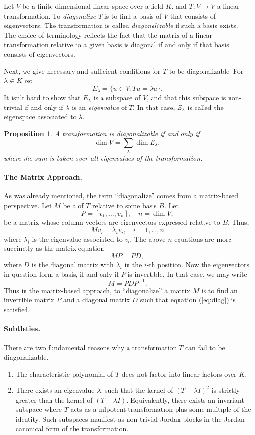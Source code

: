 \documentclass[12pt]{article}
\newtheorem{proposition}{Proposition}
\begin{document}
Let $V$ be a finite-dimensional linear space over a field $K$, and
$T:V\rightarrow V$ a linear transformation. To {\em diagonalize} $T$
is to find a basis of $V$ that consists of eigenvectors. The
transformation is called {\em diagonalizable} if such a basis exists.
The choice of terminology reflects the fact that
the matrix of a linear transformation relative to a given basis is  diagonal
if and only if that basis consists of
eigenvectors.

Next, we give necessary and sufficient conditions for $T$ to be
diagonalizable. For $\lambda\in K$ set
$$E_\lambda = \{ u\in V: Tu = \lambda u\}.$$
It isn't hard to show that $E_\lambda$ is a subspace of $V$, and that this subspace is
non-trivial if and only if $\lambda$ is an {\em eigenvalue} of $T$.  In that case, $E_\lambda$ is called the eigenspace
associated to $\lambda$. 
\begin{proposition}
A transformation is diagonalizable if and only if
$$\dim V = \sum_\lambda \dim E_\lambda,$$
where the sum is taken over all eigenvalues of the transformation.
\end{proposition}

\paragraph{The Matrix Approach.}
As was already mentioned, the  term  ``diagonalize'' comes from a matrix-based perspective.  Let
$M$ be a  of $T$ relative to some basis $B$.  Let
$$P=[v_1,\ldots,v_n],\quad n=\dim V,$$
be a matrix whose column vectors are eigenvectors expressed relative
to $B$.  Thus,
$$M v_i = \lambda_i v_i,\quad i=1,\ldots,n$$
where $\lambda_i$ is the eigenvalue associated to $v_i$.  The above
$n$ equations are more succinctly as the matrix equation
$$MP = PD,$$
where $D$ is the diagonal matrix with $\lambda_i$ in the $i$-th
position.  Now the eigenvectors in question form a basis, if and only
if $P$ is invertible.  In that case, we may write
\begin{equation}
  \label{eq:diag}
  M=PDP^{-1}.  
\end{equation}
Thus in the matrix-based approach, to ``diagonalize'' a matrix $M$ is
to find an invertible matrix $P$ and a diagonal matrix $D$ such that
equation (\ref{eq:diag}) is satisfied.  


\paragraph{Subtleties.}
There are two fundamental reasons why a transformation $T$ can fail to
be diagonalizable.
\begin{enumerate}
\item The characteristic polynomial of $T$ does not factor into linear
factors over $K$.
\item There exists an eigenvalue $\lambda$, such that the kernel of
$(T-\lambda I)^2$ is strictly greater than the kernel of $(T-\lambda
I)$. Equivalently, there exists an invariant subspace where $T$
acts as a nilpotent transformation plus some multiple of the
identity. Such subspaces manifest as non-trivial Jordan blocks in the Jordan canonical form of the transformation.\end{enumerate}
\end{document}

